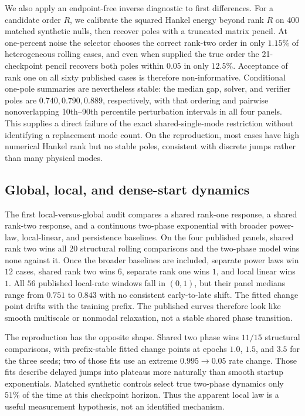 \documentclass[10pt,twocolumn]{article}
\begin{document}
We also apply an endpoint-free inverse diagnostic to first differences.  For
a candidate order $R$, we calibrate the squared Hankel energy beyond rank $R$
on 400 matched synthetic nulls, then recover poles with a truncated matrix
pencil.  At one-percent noise the selector chooses the correct rank-two order
in only $1.15\%$ of heterogeneous rolling cases, and even when supplied the
true order the 21-checkpoint pencil recovers both poles within $0.05$ in only
$12.5\%$.  Acceptance of rank one on all sixty published cases is therefore
non-informative.  Conditional one-pole summaries are nevertheless stable: the
median gap, solver, and verifier poles are $0.740,0.790,0.889$, respectively,
with that ordering and pairwise nonoverlapping 10th--90th percentile
perturbation intervals in all four panels.  This supplies a direct failure of
the exact shared-single-mode restriction without identifying a replacement
mode count.  On the reproduction, most cases have high numerical Hankel rank
but no stable poles, consistent with discrete jumps rather than many physical
modes.

\subsection{Global, local, and dense-start dynamics}

The first local-versus-global audit compares a shared rank-one response, a
shared rank-two response, and a continuous two-phase exponential with broader
power-law, local-linear, and persistence baselines.  On the four published
panels, shared rank two wins all $20$ structural rolling comparisons and the
two-phase model wins none against it.  Once the broader baselines are included,
separate power laws win $12$ cases, shared rank two wins $6$, separate rank one
wins $1$, and local linear wins $1$.  All $56$ published local-rate windows
fall in $(0,1)$, but their panel medians range from $0.751$ to $0.843$ with no
consistent early-to-late shift.  The fitted change point drifts with the
training prefix.  The published curves therefore look like smooth
multiscale or nonmodal relaxation, not a stable shared phase transition.

The reproduction has the opposite shape.  Shared two phase wins $11/15$
structural comparisons, with prefix-stable fitted change points at epochs
$1.0$, $1.5$, and $3.5$ for the three seeds; two of those fits use an extreme
$0.995\to0.05$ rate change.  Those fits describe delayed jumps into plateaus
more naturally than smooth startup exponentials.  Matched synthetic controls
select true two-phase dynamics only $51\%$ of the time at this checkpoint
horizon.  Thus the apparent local law is a useful measurement hypothesis, not
an identified mechanism.
\end{document}
